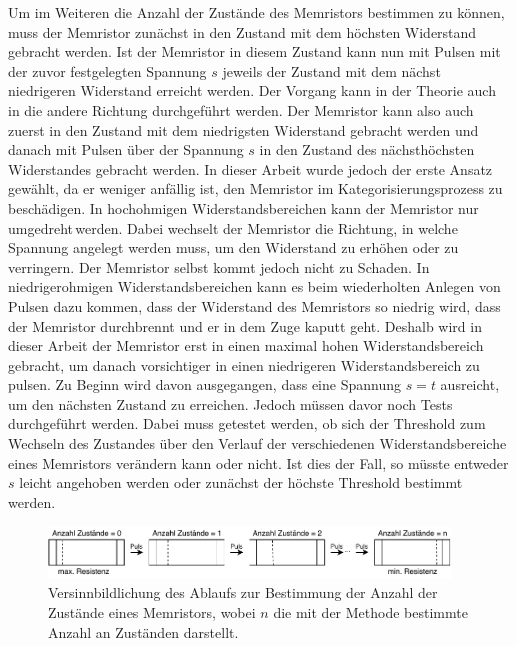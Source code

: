   Um im Weiteren die Anzahl der Zustände des Memristors bestimmen zu können, muss der Memristor zunächst in den Zustand mit dem höchsten Widerstand gebracht werden. Ist der Memristor in diesem Zustand kann nun mit Pulsen mit der zuvor festgelegten Spannung $s$ jeweils der Zustand mit dem nächst niedrigeren Widerstand erreicht werden. Der Vorgang kann in der Theorie auch in die andere Richtung durchgeführt werden. Der Memristor kann also auch zuerst in den Zustand mit dem niedrigsten Widerstand gebracht werden und danach mit Pulsen über der Spannung $s$ in den Zustand des nächsthöchsten Widerstandes gebracht werden. In dieser Arbeit wurde jedoch der erste Ansatz gewählt, da er weniger anfällig ist, den Memristor im Kategorisierungsprozess zu beschädigen. In hochohmigen Widerstandsbereichen kann der Memristor nur \glqq umgedreht\grqq\,werden. Dabei wechselt der Memristor die Richtung, in welche Spannung angelegt werden muss, um den Widerstand zu erhöhen oder zu verringern. Der Memristor selbst kommt jedoch nicht zu Schaden. In niedrigerohmigen Widerstandsbereichen kann es beim wiederholten Anlegen von Pulsen dazu kommen, dass der Widerstand des Memristors so niedrig wird, dass der Memristor durchbrennt und er in dem Zuge kaputt geht. Deshalb wird in dieser Arbeit der Memristor erst in einen maximal hohen Widerstandsbereich gebracht, um danach vorsichtiger in einen niedrigeren Widerstandsbereich zu pulsen. Zu Beginn wird davon ausgegangen, dass eine Spannung $s = t$ ausreicht, um den nächsten Zustand zu erreichen. Jedoch müssen davor noch Tests durchgeführt werden. Dabei muss getestet werden, ob sich der Threshold zum Wechseln des Zustandes über den Verlauf der verschiedenen Widerstandsbereiche eines Memristors verändern kann oder nicht. Ist dies der Fall, so müsste entweder $s$ leicht angehoben werden oder zunächst der höchste Threshold bestimmt werden.

  \begin{figure}
    \centering
      \includegraphics[width=0.95\textwidth]{images/Speicherbestimmung.pdf}
    \caption{Versinnbildlichung des Ablaufs zur Bestimmung der Anzahl der Zustände eines Memristors, wobei $n$ die mit der Methode bestimmte Anzahl an Zuständen darstellt.}
    \label{tab:Speicher_Noten}
  \end{figure}

